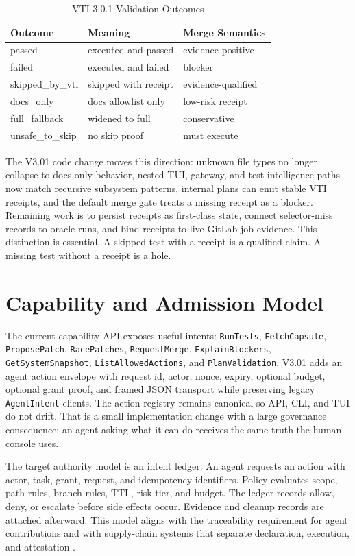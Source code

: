 \documentclass[conference]{IEEEtran}
\begin{document}
\begin{table}[t]
\caption{VTI 3.0.1 Validation Outcomes}
\centering
\begin{tabular}{lll}
\toprule
Outcome & Meaning & Merge Semantics\\
\midrule
passed & executed and passed & evidence-positive\\
failed & executed and failed & blocker\\
skipped\_by\_vti & skipped with receipt & evidence-qualified\\
docs\_only & docs allowlist only & low-risk receipt\\
full\_fallback & widened to full & conservative\\
unsafe\_to\_skip & no skip proof & must execute\\
\bottomrule
\end{tabular}
\end{table}

The V3.01 code change moves this direction: unknown file types no longer collapse to docs-only behavior, nested TUI, gateway, and test-intelligence paths now match recursive subsystem patterns, internal plans can emit stable VTI receipts, and the default merge gate treats a missing receipt as a blocker. Remaining work is to persist receipts as first-class state, connect selector-miss records to oracle runs, and bind receipts to live GitLab job evidence. This distinction is essential. A skipped test with a receipt is a qualified claim. A missing test without a receipt is a hole.

\section{Capability and Admission Model}
The current capability API exposes useful intents: \texttt{RunTests}, \texttt{FetchCapsule}, \texttt{ProposePatch}, \texttt{RacePatches}, \texttt{RequestMerge}, \texttt{ExplainBlockers}, \texttt{GetSystemSnapshot}, \texttt{ListAllowedActions}, and \texttt{PlanValidation}. V3.01 adds an agent action envelope with request id, actor, nonce, expiry, optional budget, optional grant proof, and framed JSON transport while preserving legacy \texttt{AgentIntent} clients. The action registry remains canonical so API, CLI, and TUI do not drift. That is a small implementation change with a large governance consequence: an agent asking what it can do receives the same truth the human console uses.

The target authority model is an intent ledger. An agent requests an action with actor, task, grant, request, and idempotency identifiers. Policy evaluates scope, path rules, branch rules, TTL, risk tier, and budget. The ledger records allow, deny, or escalate before side effects occur. Evidence and cleanup records are attached afterward. This model aligns with the traceability requirement for agent contributions \cite{software-agents-traceability} and with supply-chain systems that separate declaration, execution, and attestation \cite{slsa,in-toto,sigstore}.
\end{document}
